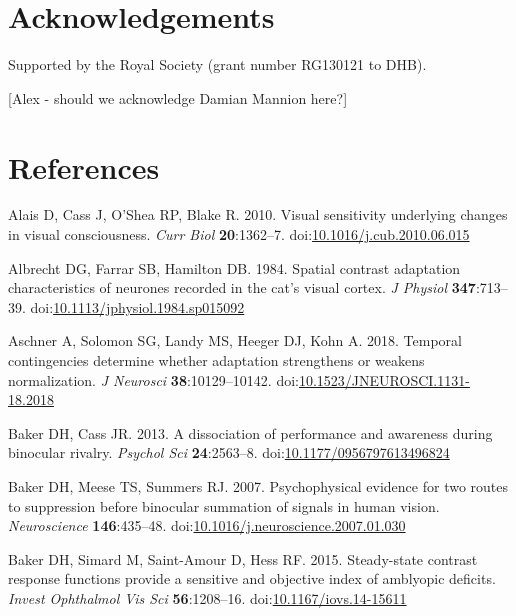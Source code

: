 \documentclass[]{article}
\begin{document}
\hypertarget{acknowledgements}{%
\section{Acknowledgements}\label{acknowledgements}}

Supported by the Royal Society (grant number RG130121 to DHB).

{[}Alex - should we acknowledge Damian Mannion here?{]}

\hypertarget{references}{%
\section*{References}\label{references}}

\hypertarget{refs}{}
\leavevmode\hypertarget{ref-Alais2010}{}%
Alais D, Cass J, O'Shea RP, Blake R. 2010. Visual sensitivity underlying changes in visual consciousness. \emph{Curr Biol} \textbf{20}:1362--7. doi:\href{https://doi.org/10.1016/j.cub.2010.06.015}{10.1016/j.cub.2010.06.015}

\leavevmode\hypertarget{ref-Albrecht1984}{}%
Albrecht DG, Farrar SB, Hamilton DB. 1984. Spatial contrast adaptation characteristics of neurones recorded in the cat's visual cortex. \emph{J Physiol} \textbf{347}:713--39. doi:\href{https://doi.org/10.1113/jphysiol.1984.sp015092}{10.1113/jphysiol.1984.sp015092}

\leavevmode\hypertarget{ref-Aschner2018}{}%
Aschner A, Solomon SG, Landy MS, Heeger DJ, Kohn A. 2018. Temporal contingencies determine whether adaptation strengthens or weakens normalization. \emph{J Neurosci} \textbf{38}:10129--10142. doi:\href{https://doi.org/10.1523/JNEUROSCI.1131-18.2018}{10.1523/JNEUROSCI.1131-18.2018}

\leavevmode\hypertarget{ref-Baker2013}{}%
Baker DH, Cass JR. 2013. A dissociation of performance and awareness during binocular rivalry. \emph{Psychol Sci} \textbf{24}:2563--8. doi:\href{https://doi.org/10.1177/0956797613496824}{10.1177/0956797613496824}

\leavevmode\hypertarget{ref-Baker2007}{}%
Baker DH, Meese TS, Summers RJ. 2007. Psychophysical evidence for two routes to suppression before binocular summation of signals in human vision. \emph{Neuroscience} \textbf{146}:435--48. doi:\href{https://doi.org/10.1016/j.neuroscience.2007.01.030}{10.1016/j.neuroscience.2007.01.030}

\leavevmode\hypertarget{ref-Baker2015}{}%
Baker DH, Simard M, Saint-Amour D, Hess RF. 2015. Steady-state contrast response functions provide a sensitive and objective index of amblyopic deficits. \emph{Invest Ophthalmol Vis Sci} \textbf{56}:1208--16. doi:\href{https://doi.org/10.1167/iovs.14-15611}{10.1167/iovs.14-15611}
\end{document}
